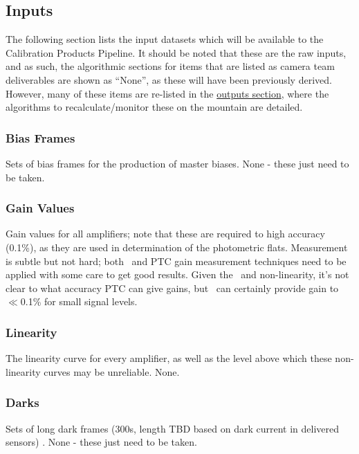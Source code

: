 
\subsection{Inputs}
\label{sec:CPP:inputs} 
The following section lists the input datasets which will be available to the Calibration Products Pipeline. It should be noted that these are the raw inputs, and as such, the algorithmic sections for items that are listed as camera team deliverables are shown as ``None'', as these will have been previously derived. However, many of these items are re-listed in the \hyperref[sec:CPP:output]{outputs section}, where the algorithms to recalculate/monitor these on the mountain are detailed.

\subsubsection{Bias Frames}\label{sec:CPP:inputs:biases} 
Sets of bias frames for the production of master biases.
\alg None - these just need to be taken.


\subsubsection{Gain Values}\label{sec:CPP:inputs:gain} 
\cameraTeam
Gain values for all amplifiers; note that these are required to high accuracy (0.1\%), as they are used in determination of the photometric flats.
\alg Measurement is subtle but not hard; both \fefiftyfive\ and PTC gain measurement techniques need to be applied with some care to get good results. Given the \bfeffect\ and non-linearity, it's not clear to what accuracy PTC can give gains, but \fefiftyfive\ can certainly provide gain to $\ll$0.1\% for small signal levels.


\subsubsection{Linearity}\label{sec:CPP:inputs:linearityCurve} 
\cameraTeam
The linearity curve for every amplifier, as well as the level above which these non-linearity curves may be unreliable.
\alg None.


\subsubsection{Darks}\label{sec:CPP:inputs:dark}
Sets of long dark frames (\smalltilde 300s, length TBD based on dark current in delivered sensors) .
\alg None - these just need to be taken.


